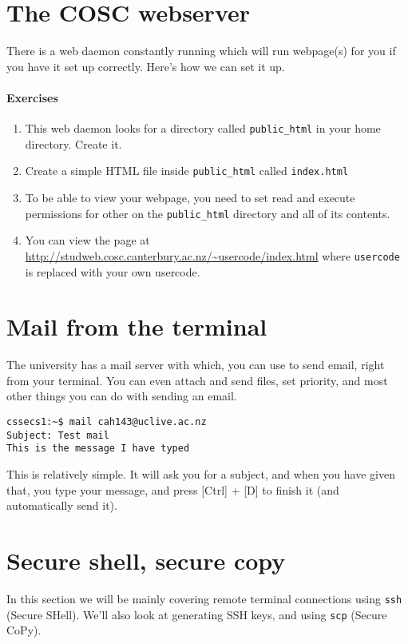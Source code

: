 \documentclass{article}
\begin{document}
\section{The COSC webserver}
There is a web daemon constantly running which will run webpage(s) for you if you have it set up correctly. Here's how we can set it up.
\paragraph{Exercises}
\begin{enumerate}
\item This web daemon looks for a directory called \texttt{public_html} in your home directory. Create it.
\item Create a simple HTML file inside \texttt{public_html} called \texttt{index.html}

\item To be able to view your webpage, you need to set read and execute permissions for other on the \texttt{public_html} directory and all of its contents.

\item You can view the page at \url{http://studweb.cosc.canterbury.ac.nz/~usercode/index.html}
where \texttt{usercode} is replaced with your own usercode.
\end{enumerate}

\section{Mail from the terminal}
The university has a mail server with which, you can use to send email, right from your terminal. You can even attach and send files, set priority, and most other things you can do with sending an email.

\begin{verbatim}
cssecs1:~$ mail cah143@uclive.ac.nz
Subject: Test mail
This is the message I have typed
\end{verbatim}

This is relatively simple. It will ask you for a subject, and when you have given that, you type your message, and press [Ctrl] + [D] to finish it (and automatically send it).

\section{Secure shell, secure copy}
In this section we will be mainly covering remote terminal connections using \texttt{ssh} (Secure SHell). We'll also look at generating SSH keys, and using \texttt{scp} (Secure CoPy).
\end{document}
